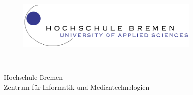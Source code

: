 \thispagestyle{empty}


\begin{figure}[t]
 \centering
 \includegraphics[width=0.8\textwidth]{abb/logo}
\end{figure}


\begin{verbatim}


\end{verbatim}

\begin{center}
\Large{Hochschule Bremen}\\
\Large{Zentrum für Informatik und Medientechnologien}\\
\end{center}


